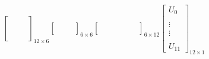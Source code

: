 \documentclass[a4paper,10pt]{article}
\begin{document}
\[
\left[ 
\begin{array}{ccc}
  &  &     \\
  &  &     \\
  &  &     \\
  &  &     \\
  &  &     \\
  &  &     
\end{array}
\right]_{12\times6}
\left[ 
\begin{array}{ccc}
  &  &     \\
  &  &     \\
  &  &     
\end{array}
\right]_{6\times6}
\left[ 
\begin{array}{cccccc}
  &  &  & & &  \\
  &  &  & & & \\
  &  &  & & &    
\end{array}
\right]_{6\times12}
\left[ 
\begin{array}{c}
U_0      \\
         \\
\vdots   \\
\vdots   \\
         \\
U_{11}
\end{array}
\right]_{12\times1}
\]
\end{document}
